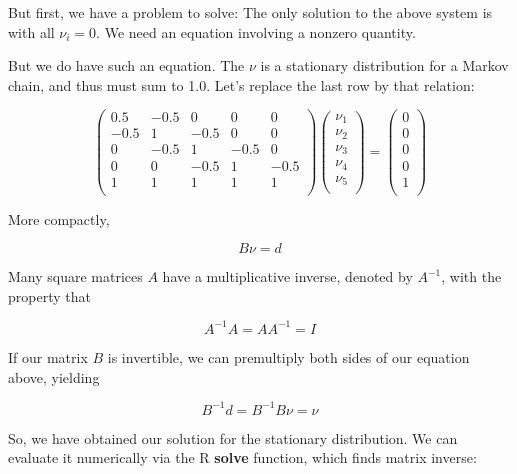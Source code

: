 \documentclass[
  letterpaper,
  DIV=11,
  numbers=noendperiod,
  oneside]{scrreprt}
\begin{document}
But first, we have a problem to solve: The only solution to the above
system is with all \(\nu_i = 0\). We need an equation involving a
nonzero quantity.

But we do have such an equation. The \(\nu\) is a stationary
distribution for a Markov chain, and thus must sum to 1.0. Let's replace
the last row by that relation:

\[
\left (
\begin{array}{rrrrr}
0.5 & -0.5 & 0 & 0 & 0 \\
-0.5 & 1 & -0.5 & 0 & 0 \\
0 & -0.5 & 1 & -0.5 & 0 \\
0 & 0 & -0.5 & 1 & -0.5 \\
1 & 1 & 1 & 1 & 1 \\
\end{array}
\right )
\left (
\begin{array}{rrrrr}
\nu_1 \\
\nu_2 \\
\nu_3 \\
\nu_4 \\
\nu_5 \\
\end{array}
\right ) =
\left (
\begin{array}{rrrrr}
0 \\
0 \\
0 \\
0 \\
1 \\
\end{array}
\right )
\]

More compactly,

\[
B \nu = d
\]

Many square matrices \(A\) have a multiplicative inverse, denoted by
\(A^{-1}\), with the property that

\[
A^{-1} A = A A^{-1} = I
\]

If our matrix \(B\) is invertible, we can premultiply both sides of our
equation above, yielding

\[
B^{-1} d = B^{-1} B \nu = \nu
\]

So, we have obtained our solution for the stationary distribution. We
can evaluate it numerically via the R \textbf{solve} function, which
finds matrix inverse:
\end{document}
